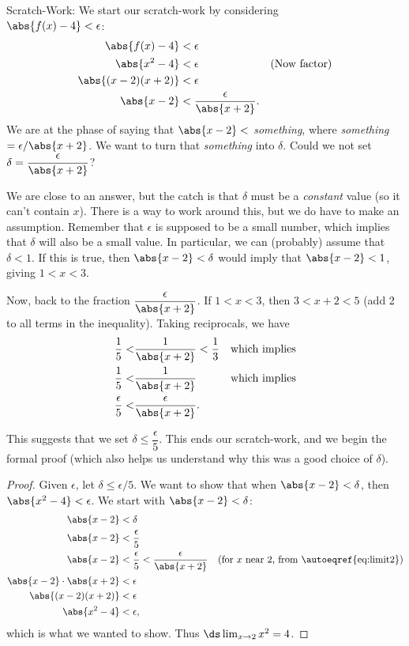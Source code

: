 {Scratch-Work:
We start our scratch-work by considering\\
$\abs{f(x)-4}<\epsilon$:
\begin{align}
\abs{f(x)-4} &< \epsilon \notag\\
\abs{x^2-4} &< \epsilon & \text{(Now factor)}\notag\\
\abs{(x-2)(x+2)} &< \epsilon \notag\\
\abs{x-2} &<\frac{\epsilon}{\abs{x+2}}.\label{eq:lim1}
\end{align}
We are at the phase of saying that $\abs{x-2}<$ \textit{something}, where \textit{something}$=\epsilon/\abs{x+2}$. We want to turn that \textit{something} into $\delta$. Could we not set $\delta = \dfrac{\epsilon}{\abs{x+2}}$?  

We are close to an answer, but the catch is that $\delta$ must be a \textit{constant} value (so it can't contain $x$).  There is a way to work around this, but we do have to make an assumption.  Remember that $\epsilon$ is supposed to be a small number, which implies that $\delta$ will also be a small value.  In particular, we can (probably) assume that $\delta < 1$.  If this is true, then $\abs{x-2}< \delta$ would imply that $\abs{x-2}< 1$, giving $1 < x < 3$.  

Now, back to the fraction $\dfrac{\epsilon}{\abs{x+2}}$.  If $1<x<3$, then $3<x+2<5$ (add 2 to all terms in the inequality).  Taking reciprocals, we have 
\begin{align}
\frac15 <& \frac1{\abs{x+2}} < \frac 13 & \text{which implies}\notag\\
\frac15 <& \frac1{\abs{x+2}} & \text{which implies}\notag\\
\frac\epsilon5<&\frac{\epsilon}{\abs{x+2}}\text{.}\label{eq:limit2}
\end{align}

This suggests that we set 
$\delta \leq \dfrac{\epsilon}{5}$. This ends our scratch-work, and we begin the formal proof (which also helps us understand why this was a good choice of $\delta$).

\begin{proof}
Given $\epsilon$, let $\delta \leq \epsilon/5$. We want to show that when $\abs{x-2}<\delta$, then $\abs{x^2-4}<\epsilon$. We start with $\abs{x-2}<\delta$:
\begin{align*}
\abs{x-2} &< \delta \\
\abs{x-2} &< \frac{\epsilon}5\\
\abs{x-2} &< \frac\epsilon5 < \frac{\epsilon}{\abs{x+2}} & \text{(for $x$ near 2, from \autoeqref{eq:limit2})}\\
\abs{x-2}\cdot\abs{x+2} &< \epsilon\\
\abs{(x-2)(x+2)} &< \epsilon\\
\abs{x^2-4} &<\epsilon,
\end{align*}
which is what we wanted to show. Thus $\ds \lim_{x\to 2}x^2 = 4$.
\end{proof}

}
